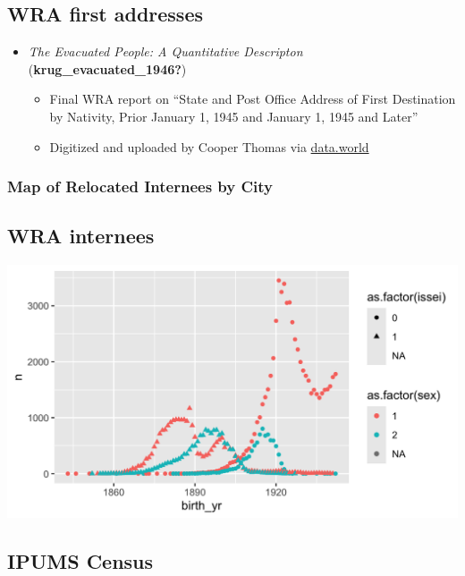 \documentclass[
]{article}
\providecommand{\tightlist}{%
  \setlength{\itemsep}{0pt}\setlength{\parskip}{0pt}}\usepackage{longtable,booktabs,array}
\begin{document}
\subsection{WRA first addresses}\label{wra-first-addresses}

\begin{itemize}
\tightlist
\item
  {\emph{The Evacuated People: A Quantitative Descripton}}
  (\textbf{krug\_evacuated\_1946?})

  \begin{itemize}
  \tightlist
  \item
    Final WRA report on ``State and Post Office Address of First
    Destination by Nativity, Prior January 1, 1945 and January 1, 1945
    and Later''
  \item
    Digitized and uploaded by Cooper Thomas via
    \href{https://data.world/infinitecoop/japanese-internment-camps}{data.world}
  \end{itemize}
\end{itemize}

\subsubsection{Map of Relocated Internees by
City}\label{map-of-relocated-internees-by-city}

\subsection{WRA internees}\label{wra-internees}

\includegraphics{figures/wra-internee-cohorts.png}

\subsection{IPUMS Census}\label{ipums-census}
\end{document}
